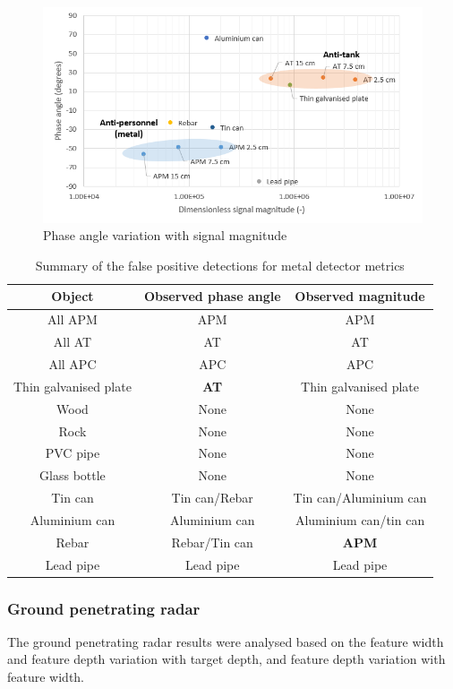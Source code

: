 \documentclass[main.tex]{subfiles}
\begin{document}
\begin{figure}[!ht]
\includegraphics[width=\textwidth]{5-Testing/phaseMag.PNG}
\centering
\caption{Phase angle variation with signal magnitude}
\end{figure}

\begin{table}[!ht]
\centering
\caption{ Summary of the false positive detections for metal detector metrics}
\begin{tabular}{ccc}
\toprule
Object & Observed phase angle & Observed magnitude \\ \midrule
All APM & APM & APM \\
All AT & AT & AT \\
All APC & APC & APC \\
Thin galvanised plate & \textbf{AT} & Thin galvanised plate \\
Wood & None & None \\
Rock & None & None \\
PVC pipe & None & None \\
Glass bottle & None & None \\
Tin can & Tin can/Rebar & Tin can/Aluminium can \\
Aluminium can & Aluminium can & Aluminium can/tin can \\
Rebar & Rebar/Tin can & \textbf{APM} \\
Lead pipe & Lead pipe & Lead pipe\\ \bottomrule
\end{tabular}
\end{table}

\subsubsection{Ground penetrating radar}
The ground penetrating radar results were analysed based on the feature width and feature depth variation with target depth, and feature depth variation with feature width. 
\end{document}

